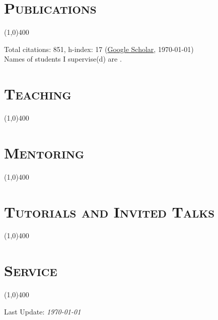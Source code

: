 \documentclass[10pt]{article}
\newcommand{\student}[1]{{\color{PineGreen}{#1}}}
\def\citNo{851}
\def\hIndex{17}
\begin{document}
\section*{\scshape Publications}
\vspace{-14pt}\hspace{6pt}\line(1,0){400}

\noindent
Total citations: \citNo, h-index: \hIndex \hspace{8pt} (\href{https://scholar.google.com/citations?hl=en&user=ASf9Q04AAAAJ&view_op=list_works&sortby=pubdate}{Google Scholar}, \monthyeardate\today)\\
Names of students I supervise(d) are \student{colored}.


\section*{\scshape Teaching} 
\vspace{-14pt}\hspace{6pt}\line(1,0){400}


\section*{\scshape Mentoring}
\vspace{-14pt}\hspace{6pt}\line(1,0){400}


\section*{\scshape Tutorials and Invited Talks}
\vspace{-14pt}\hspace{6pt}\line(1,0){400}


\section*{\scshape Service}
\vspace{-14pt}\hspace{6pt}\line(1,0){400}


%

\vspace*{\fill}
\centering Last Update: \textit{\today}
\end{document}
